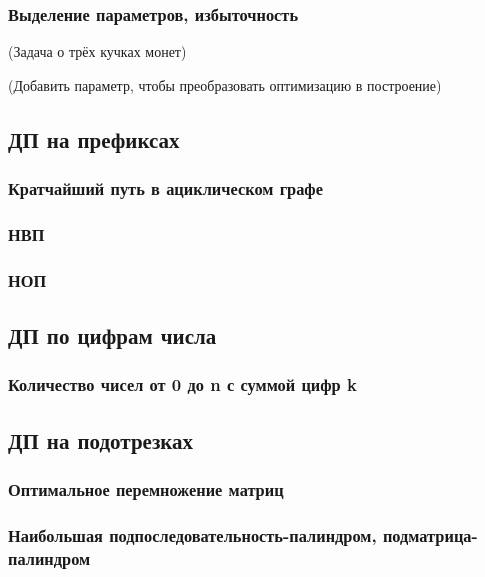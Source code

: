 \documentclass[a4paper,12pt]{article}
\begin{document}
      \subsubsection{Выделение параметров, избыточность}

      (Задача о трёх кучках монет)

      (Добавить параметр, чтобы преобразовать оптимизацию в построение)

    \subsection{ДП на префиксах}

      \subsubsection{Кратчайший путь в ациклическом графе}

      \subsubsection{НВП}

      \subsubsection{НОП}
    
    \subsection{ДП по цифрам числа}

      \subsubsection{Количество чисел от 0 до n с суммой цифр k}
    
    \subsection{ДП на подотрезках}

      \subsubsection{Оптимальное перемножение матриц}

      \subsubsection{Наибольшая подпоследовательность-палиндром, подматрица-палиндром}
\end{document}
